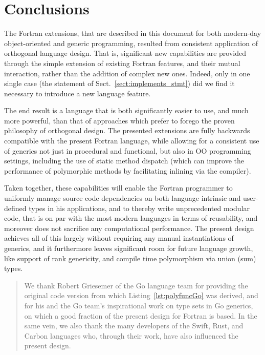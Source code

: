 \documentclass[11pt,oneside]{report}
\newcommand{\code}[1]{{\selectfont\ttfamily{#1}}}
\begin{document}
\section{Conclusions}

The Fortran extensions, that are described in this document for both
modern-day object-oriented and generic programming, resulted from
consistent application of orthogonal language design. That is,
significant new capabilities are provided through the simple extension
of existing Fortran features, and their mutual interaction, rather
than the addition of complex new ones. Indeed, only in one single case
(the \code{implements} statement of Sect.~\ref{sect:implements_stmt})
did we find it necessary to introduce a new language feature.

The end result is a language that is both significantly easier to use,
and much more powerful, than that of approaches which prefer to forego
the proven philosophy of orthogonal design. The presented extensions
are fully backwards compatible with the present Fortran language,
while allowing for a consistent use of generics not just in procedural
and functional, but also in OO programming settings, including the use
of static method dispatch (which can improve the performance of
polymorphic methods by facilitating inlining via the compiler).

Taken together, these capabilities will enable the Fortran programmer
to uniformly manage source code dependencies on both language
intrinsic and user-defined types in his applications, and to thereby
write unprecedented modular code, that is on par with the most modern
languages in terms of reusability, and moreover does not sacrifice any
computational performance. The present design achieves all of this
largely without requiring any manual instantiations of generics, and
it furthermore leaves significant room for future language growth,
like support of rank genericity, and compile time polymorphism via
union (sum) types.




\renewcommand{\abstractname}{Acknowledgements}

\begin{abstract}
We thank Robert Griesemer of the Go language team for providing the
original code version from which Listing~\ref{lst:polyfuncGo} was
derived, and for his and the Go team's inspirational work on type sets
in Go generics, on which a good fraction of the present design for
Fortran is based. In the same vein, we also thank the many developers
of the Swift, Rust, and Carbon languages who, through their work, have
also influenced the present design.
\end{abstract}
\end{document}
